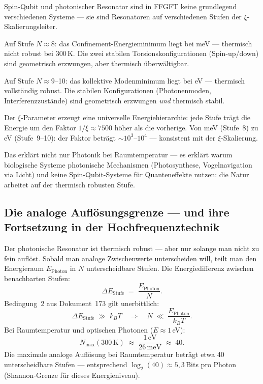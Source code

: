 \begin{foundation}
Spin-Qubit und photonischer Resonator sind
in FFGFT keine grundlegend verschiedenen Systeme ---
sie sind Resonatoren auf verschiedenen Stufen
der $\xi$-Skalierungsleiter.

Auf Stufe $N \approx 8$: das Confinement-Energieminimum
liegt bei meV --- thermisch nicht robust bei 300\,K.
Die zwei stabilen Torsionskonfigurationen (Spin-up/down)
sind geometrisch erzwungen, aber thermisch überwältigbar.

Auf Stufe $N \approx 9$--10: das kollektive Modenminimum
liegt bei eV --- thermisch vollständig robust.
Die stabilen Konfigurationen (Photonenmoden, Interferenzzustände)
sind geometrisch erzwungen \emph{und} thermisch stabil.

Der $\xi$-Parameter erzeugt eine universelle
Energiehierarchie: jede Stufe trägt die Energie
um den Faktor $1/\xi \approx 7500$ höher als die vorherige.
Von meV (Stufe~8) zu eV (Stufe~9--10):
der Faktor beträgt $\sim 10^3$--$10^4$ ---
konsistent mit der $\xi$-Skalierung.

Das erklärt nicht nur Photonik bei Raumtemperatur ---
es erklärt warum biologische Systeme photonische
Mechanismen (Photosynthese, Vogelnavigation via Licht)
und keine Spin-Qubit-Systeme für Quanteneffekte nutzen:
die Natur arbeitet auf der thermisch robusten Stufe.
\end{foundation}

\subsection{Die analoge Auflösungsgrenze --- und ihre Fortsetzung
  in der Hochfrequenztechnik}
\label{sec:aufloesung}

Der photonische Resonator ist thermisch robust ---
aber nur solange man nicht zu fein auflöst.
Sobald man analoge Zwischenwerte unterscheiden will,
teilt man den Energieraum $E_\text{Photon}$ in
$N$ unterscheidbare Stufen.
Die Energiedifferenz zwischen benachbarten Stufen:
\begin{equation}
  \Delta E_\text{Stufe} \;=\; \frac{E_\text{Photon}}{N}.
\end{equation}
Bedingung~2 aus Dokument~173 gilt unerbittlich:
\begin{equation}
  \Delta E_\text{Stufe} \;\gg\; k_BT
  \quad\Longrightarrow\quad
  N \;\ll\; \frac{E_\text{Photon}}{k_BT}.
\end{equation}
Bei Raumtemperatur und optischen Photonen ($E \approx 1$\,eV):
\begin{equation}
  N_\text{max}(300\,\text{K})
  \;\approx\; \frac{1\,\text{eV}}{26\,\text{meV}}
  \;\approx\; 40.
\end{equation}
Die maximale analoge Auflösung bei Raumtemperatur
beträgt etwa 40 unterscheidbare Stufen ---
entsprechend $\log_2(40) \approx 5{,}3$\,Bits
pro Photon (Shannon-Grenze für dieses Energieniveau).

